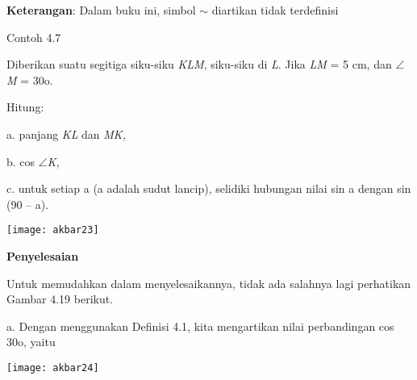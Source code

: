 \documentclass[11pt,fleqn]{book} %
\begin{document}
\noindent \textbf{}

\noindent \textbf{}

\noindent \textbf{}

\noindent \textbf{}

\noindent \textbf{Keterangan}: Dalam buku ini, simbol $\sim$ diartikan tidak terdefinisi

\noindent 

\noindent Contoh 4.7

\noindent Diberikan suatu segitiga siku-siku \textit{KLM}, siku-siku di \textit{L}. Jika \textit{LM }= 5 cm, dan $\mathrm{\angle }$\textit{M }= 30o.

\noindent 

\noindent Hitung:

\noindent a. panjang \textit{KL }dan \textit{MK,}

\noindent b. cos $\mathrm{\angle }$\textit{K,}

\noindent c. untuk setiap a (a adalah sudut lancip), selidiki hubungan nilai sin a dengan sin (90 -- a).

\noindent 

\noindent 

\noindent 

\noindent 

\noindent 

\noindent \texttt{[image: akbar23]}

\noindent \textbf{}

\noindent \textbf{Penyelesaian}

\noindent 

\noindent Untuk memudahkan dalam menyelesaikannya, tidak ada salahnya lagi perhatikan Gambar 4.19 berikut.

\noindent a. Dengan menggunakan Definisi 4.1, kita mengartikan nilai perbandingan cos 30o, yaitu

\noindent \texttt{[image: akbar24]}

\noindent 

\noindent 

\noindent 

\noindent 

\noindent 

 

\noindent 

\noindent 

\noindent 

\noindent 
\end{document}
